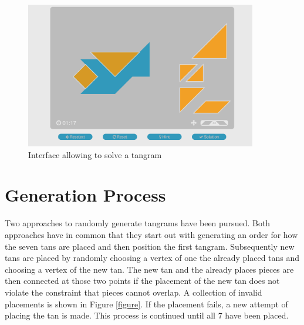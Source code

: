 \begin{figure}
\centering
    \includegraphics[width=0.9\textwidth]{figures/game.png}
  \caption{Interface allowing to solve a tangram}  
  \label{game}
\end{figure}

\section{Generation Process}
\label{generate}

Two approaches to randomly generate tangrams have been pursued. Both approaches have in common that they start out with generating an order for how the seven tans are placed and then position the first tangram. Subsequently new tans are placed by randomly choosing a vertex of one the already placed tans and choosing a vertex of the new tan. The new tan and the already places pieces are then connected at those two points if the placement of the new tan does not violate the constraint that pieces cannot overlap. A collection of invalid placements is shown in Figure \ref{figure}. If the placement fails, a new attempt of placing the tan is made. This process is continued until all 7 have been placed. 


